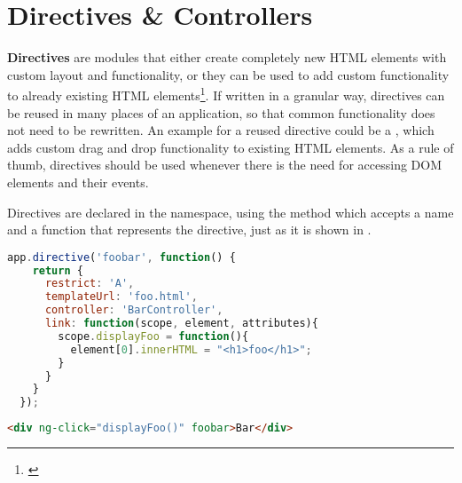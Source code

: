 \section{Directives \& Controllers}
\label{sect:directives_controllers}

\textbf{Directives} are modules that either create completely new HTML elements with custom layout and functionality, or they can be used to add custom functionality to already existing HTML elements\footnote{\cite[p. 61ff]{lerner2013ngbook}}. If written in a granular way, directives can be reused in many places of an application, so that common functionality does not need to be rewritten. An example for a reused directive could be a , which adds custom drag and drop functionality to existing HTML elements. As a rule of thumb, directives should be used whenever there is the need for accessing DOM elements and their events.

Directives are declared in the  namespace, using the  method which accepts a name and a function that represents the directive, just as it is shown in .

\begin{lstlisting}[language=JavaScript, caption=A simple AngularJS directive, label=lst:angular-directive]
  app.directive('foobar', function() {
    return {
      restrict: 'A',
      templateUrl: 'foo.html',
      controller: 'BarController',
      link: function(scope, element, attributes){
        scope.displayFoo = function(){
          element[0].innerHTML = "<h1>foo</h1>";
        }
      }
    }
  });
\end{lstlisting}

\begin{lstlisting}[language=HTML, caption=A simple AngularJS directive (HTML), label=lst:angular-directive-html]
  <div ng-click="displayFoo()" foobar>Bar</div>
\end{lstlisting}

